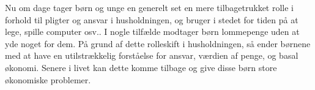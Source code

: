 Nu om dage tager børn og unge en generelt set en mere tilbagetrukket rolle i forhold til pligter og ansvar i husholdningen, og bruger i stedet for tiden på at lege, spille computer osv.. I nogle tilfælde modtager børn lommepenge uden at yde noget for dem. På grund af dette rolleskift i husholdningen, så ender børnene med at have en utilstrækkelig forståelse for ansvar, værdien af penge, og basal økonomi. Senere i livet kan dette komme tilbage og give disse børn store økonomiske problemer.